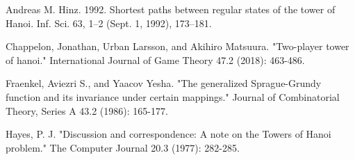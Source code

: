 \documentclass[12pt,reqno]{amsart}
\theoremstyle{plain}
\begin{document}
\begin{boxlabel}

\item Andreas M. Hinz. 1992. Shortest paths between regular states of the tower of Hanoi. Inf. Sci. 63, 1–2 (Sept. 1, 1992), 173–181.
\item Chappelon, Jonathan, Urban Larsson, and Akihiro Matsuura. "Two-player tower of hanoi." International Journal of Game Theory 47.2 (2018): 463-486.
\item Fraenkel, Aviezri S., and Yaacov Yesha. "The generalized Sprague-Grundy function and its invariance under certain mappings." Journal of Combinatorial Theory, Series A 43.2 (1986): 165-177.
\item Hayes, P. J. "Discussion and correspondence: A note on the Towers of Hanoi problem." The Computer Journal 20.3 (1977): 282-285.
\end{boxlabel}
\end{document}
